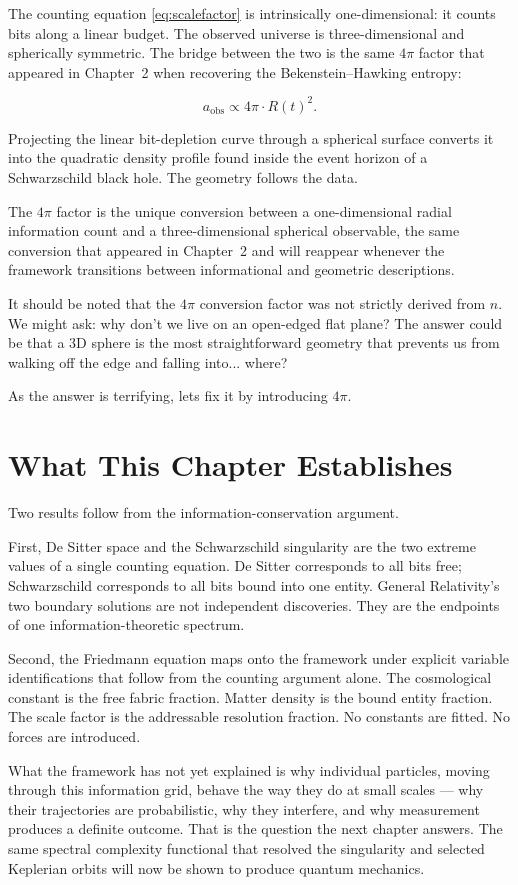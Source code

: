The counting equation \eqref{eq:scalefactor} is intrinsically
one-dimensional: it counts bits along a linear budget. The observed
universe is three-dimensional and spherically symmetric. The bridge
between the two is the same $4\pi$ factor that appeared in Chapter~2
when recovering the Bekenstein--Hawking entropy:

\[
a_{\mathrm{obs}} \propto 4\pi \cdot R(t)^2.
\]

Projecting the linear bit-depletion curve through a spherical surface
converts it into the quadratic density profile found inside the event
horizon of a Schwarzschild black hole. The geometry follows the data.

The $4\pi$ factor is the unique
conversion between a one-dimensional radial information count and a
three-dimensional spherical observable, the same conversion that
appeared in Chapter~2 and will reappear whenever the framework
transitions between informational and geometric descriptions.

It should be noted that the $4\pi$ conversion factor was not
strictly derived from $n$. We might ask: why don't we live on an
open-edged flat plane? The answer could be that a 3D sphere is the
most straightforward geometry that prevents us from walking off the
edge and falling into... where?

As the answer is terrifying, lets fix it by introducing $4\pi$.


\section{What This Chapter Establishes}

Two results follow from the information-conservation argument.

First, De Sitter space and the Schwarzschild singularity are the two
extreme values of a single counting equation. De Sitter corresponds to
all bits free; Schwarzschild corresponds to all bits bound into one
entity. General Relativity's two boundary solutions are not independent
discoveries. They are the endpoints of one information-theoretic
spectrum.

Second, the Friedmann equation maps onto the framework under explicit
variable identifications that follow from the counting argument alone.
The cosmological constant is the free fabric fraction. Matter density is
the bound entity fraction. The scale factor is the addressable resolution
fraction. No constants are fitted. No forces are introduced.

What the framework has not yet explained is why individual particles,
moving through this information grid, behave the way they do at small
scales --- why their trajectories are probabilistic, why they interfere,
and why measurement produces a definite outcome. That is the question the
next chapter answers. The same spectral complexity functional that
resolved the singularity and selected Keplerian orbits will now be shown
to produce quantum mechanics.
